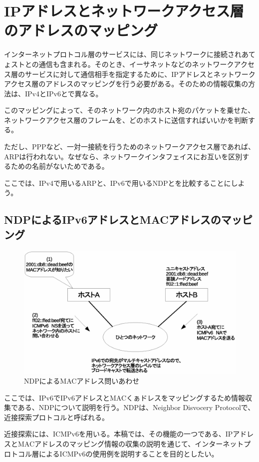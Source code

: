\section{IPアドレスとネットワークアクセス層のアドレスのマッピング}

インターネットプロトコル層のサービスには、同じネットワークに接続されあてょストとの通信も含まれる。そのとき、イーサネットなどのネットワークアクセス層のサービスに対して通信相手を指定するために、IPアドレスとネットワークアクセス層のアドレスのマッピングを行う必要がある。そのための情報収集の方法は、IPv4とIPv6とで異なる。

このマッピングによって、そのネットワーク内のホスト宛のパケットを乗せた、ネットワークアクセス層のフレームを、どのホストに送信すればいいかを判断する。

ただし、PPPなど、一対一接続を行うためのネットワークアクセス層であれば、ARPは行われない。なぜなら、ネットワークインタフェイスにお互いを区別するための名前がないためである。

ここでは、IPv4で用いるARPと、IPv6で用いるNDPとを比較することにしよう。

\subsection{NDPによるIPv6アドレスとMACアドレスのマッピング}
\begin{figure}[htbp]
	\includegraphics[width=12cm,clip]{draw/ndp.eps}
	\caption{NDPによるMACアドレス問いあわせ}
	\label{fig:NDP}
\end{figure}

ここでは、IPv6でIPv6アドレスとMACくぁドレスをマッピングするため情報収集である、NDPについて説明を行う。NDPは、Neighbor Disvocery Protocolで、近接探索プロトコルと呼ばれる。

近接探索には、ICMPv6を用いる。本稿では、その機能の一つである、IPアドレスとMACアドレスのマッピング情報の収集の説明を通じて、インターネットプロトコル層によるICMPv6の使用例を説明することを目的としたい。

